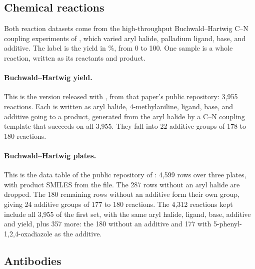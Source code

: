 \subsection{Chemical reactions}\label{app:datasets:reactions}

Both reaction datasets come from the high-throughput Buchwald--Hartwig C--N coupling experiments of \citet{Ahneman2018}, which varied aryl halide, palladium ligand, base, and additive. The label is the yield in \%, from 0 to 100. One sample is a whole reaction, written as its reactants and product.

\paragraph{Buchwald--Hartwig yield.} This is the version released with \citet{Schwaller2021a}, from that paper's public repository: 3,955 reactions. Each is written as aryl halide, 4-methylaniline, ligand, base, and additive going to a product, generated from the aryl halide by a C--N coupling template that succeeds on all 3,955. They fall into 22 additive groups of 178 to 180 reactions.

\paragraph{Buchwald--Hartwig plates.} This is the data table of the public repository of \citet{Ahneman2018}: 4,599 rows over three plates, with product SMILES from the file. The 287 rows without an aryl halide are dropped. The 180 remaining rows without an additive form their own group, giving 24 additive groups of 177 to 180 reactions. The 4,312 reactions kept include all 3,955 of the first set, with the same aryl halide, ligand, base, additive and yield, plus 357 more: the 180 without an additive and 177 with 5-phenyl-1,2,4-oxadiazole as the additive.

\subsection{Antibodies}\label{app:datasets:antibodies}

